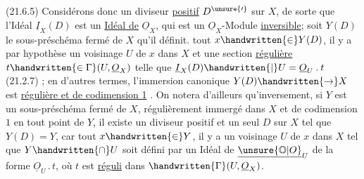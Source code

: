 (21.6.5) Considérons donc un diviseur \uline{positif} $D^{\unsure{\prime}}$ sur $X$, de sorte que l'Idéal  $\underline I_{X}(D)$ est un \uline{Idéal de} $\underline O_{X}$, qui est un $\underline O_{X}$-Module \uline{inversible}; soit $Y(D)$ le sous-préschéma fermé de $X$ qu'il définit.   tout $x\handwritten{\in}Y(D)$,  il y a par hypothèse un voisinage  $U$ de $x$ dans $X$ et une section \uline{régulière} $t\handwritten{\in\Gamma}(U,\underline O_{X})$ telle que $\underline I_{X}(D)\handwritten{\mid}U=\underline O_{U}\mathbin{.}t$ (21.2.7) ; en d'autres termes, l'immersion canonique $Y(D)\handwritten{\to}X$ est \uline{régulière et de codimension 1} . On notera d'ailleurs qu'inversement, si $Y$ \reversemarginpar
est un sous-préschéma fermé de $X$, régulièrement immergé dans $X$ et  de codimension $1$ en tout point de $Y$, il existe un diviseur positif et un seul  $D$ sur $X$ tel que $Y(D)=Y$, car  tout $x\handwritten{\in}Y$, il y a un voisinage $U$ de $x$ dans $X$ tel que $Y\handwritten{\cap}U$ soit défini par un Idéal de $\underline{\unsure{\mathbb O|O}}_{U}$ de la forme $\underline O_{U}\mathbin{.}t$, où $t$ est \uline{réguli} dans $\handwritten{\Gamma}(U,\underline O_{X})$.


